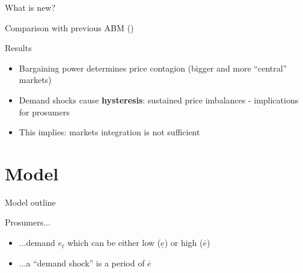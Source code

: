 \documentclass{beamer}
\begin{document}
\begin{frame}{What is new?}

    Comparison with previous ABM (\cite{Weidlich2008})
    \vfill

    \hfill
\end{frame}

\begin{frame}{Results}
    \begin{itemize} \setlength\itemsep{1.5em}
              \pause \item Bargaining power determines price contagion (bigger and more ``central'' markets)
              \pause \item Demand shocks cause \textbf{hysteresis}: sustained price imbalances - implications for prosumers
              \pause \item This implies: markets integration is not sufficient
    \end{itemize}
\end{frame}

\section{Model}

\begin{frame}{Model outline}
    \centering
    \resizebox{\textwidth}{!}{}
\end{frame}

\begin{frame}
    Prosumers...
    \begin{itemize} \setlength\itemsep{1.5em}
              \pause \item ...demand $e_t$ which can be either low ($\underline{e}$) or high ($\overline{e}$)
              \pause \item ...a ``demand shock'' is a period of $\overline{e}$
    \end{itemize}
\end{frame}
\end{document}
